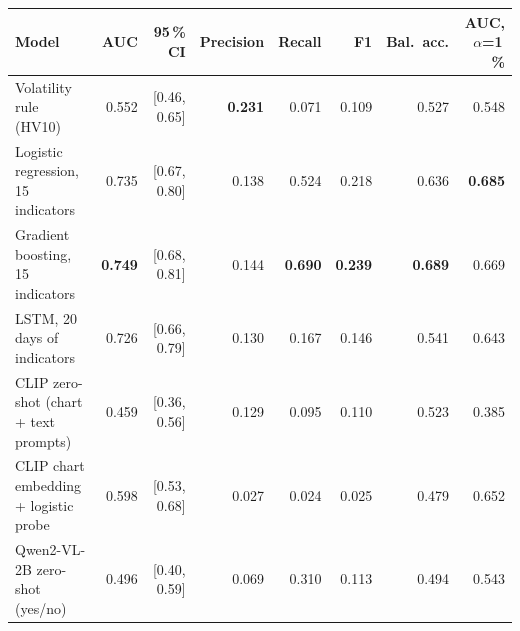 \begin{tabular}{lrrrrrrr}
\toprule
Model & AUC & 95\,\% CI & Precision & Recall & F1 & Bal.\ acc. & AUC, $\alpha$=1\,\% \\
\midrule
Volatility rule (HV10) & 0.552 & [0.46, 0.65] & \textbf{0.231} & 0.071 & 0.109 & 0.527 & 0.548 \\
Logistic regression, 15 indicators & 0.735 & [0.67, 0.80] & 0.138 & 0.524 & 0.218 & 0.636 & \textbf{0.685} \\
Gradient boosting, 15 indicators & \textbf{0.749} & [0.68, 0.81] & 0.144 & \textbf{0.690} & \textbf{0.239} & \textbf{0.689} & 0.669 \\
LSTM, 20 days of indicators & 0.726 & [0.66, 0.79] & 0.130 & 0.167 & 0.146 & 0.541 & 0.643 \\
CLIP zero-shot (chart + text prompts) & 0.459 & [0.36, 0.56] & 0.129 & 0.095 & 0.110 & 0.523 & 0.385 \\
CLIP chart embedding + logistic probe & 0.598 & [0.53, 0.68] & 0.027 & 0.024 & 0.025 & 0.479 & 0.652 \\
Qwen2-VL-2B zero-shot (yes/no) & 0.496 & [0.40, 0.59] & 0.069 & 0.310 & 0.113 & 0.494 & 0.543 \\
\bottomrule
\end{tabular}
